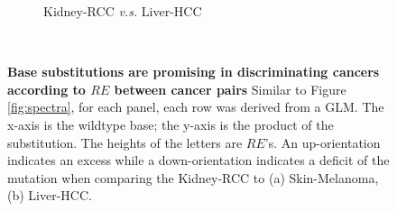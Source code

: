 \begin{figure}[htbp]
\begin{subfigure}{.5\textwidth}
    \caption{Kidney-RCC \textit{v.s.} Liver-HCC}
    \label{fig:spectra_kidney_liver}
    \end{subfigure} \\
    \vspace{0.5cm}
    \caption{\textbf{Base substitutions are promising in discriminating cancers according to $RE$ between cancer pairs} Similar to Figure \ref{fig:spectra}, for each panel, each row was derived from a GLM. The x-axis is the wildtype base; the y-axis is the product of the substitution. The heights of the letters are $RE$'s. An up-orientation indicates an excess while a down-orientation indicates a deficit of the mutation when comparing the Kidney-RCC to (a) Skin-Melanoma, (b) Liver-HCC.}
    \label{fig:paired_spectra}
\end{figure}
